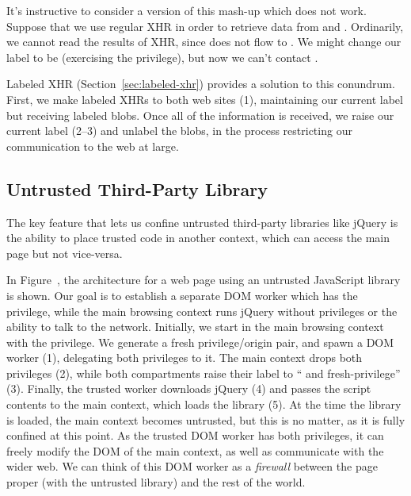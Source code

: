 It's instructive to consider a version of this mash-up which does not
work.  Suppose that we use regular XHR in order to retrieve data from
 and .  Ordinarily, we cannot read
the results of XHR, since  does not flow to .
We might change our label to be  (exercising the 
privilege), but now we can't contact .

Labeled XHR (Section~\ref{sec:labeled-xhr}) provides a solution to
this conundrum.  First, we make labeled XHRs to both web sites (1),
maintaining our current label but receiving labeled blobs.  Once all of
the information is received, we raise our current label (2--3) and
unlabel the blobs, in the process restricting our communication to the
web at large.

\subsection{Untrusted Third-Party Library}
\label{sec:apps-third-party}

The key feature that lets us confine untrusted third-party libraries
like jQuery is the ability to place trusted code in another context,
which can access the main page but not vice-versa.

In Figure~, the architecture for a web page using an
untrusted JavaScript library is shown.  Our goal is to establish a
separate DOM worker which has the  privilege, while the
main browsing context runs jQuery without privileges or the ability to
talk to the network.  Initially, we start in the main browsing context
with the  privilege.  We generate a fresh privilege/origin
pair, and spawn a DOM worker (1), delegating both privileges to it.  The
main context drops both privileges (2), while both compartments raise
their label to `` and fresh-privilege'' (3).  Finally, the
trusted worker downloads jQuery (4) and passes the script contents to
the main context, which loads the library (5).  At the time the library
is loaded, the main context becomes untrusted, but this is no matter, as
it is fully confined at this point.  As the trusted DOM worker has both
privileges, it can freely modify the DOM of the main context, as well as
communicate with the wider web.  We can think of this DOM worker as a
\emph{firewall} between the page proper (with the untrusted library)
and the rest of the world.
